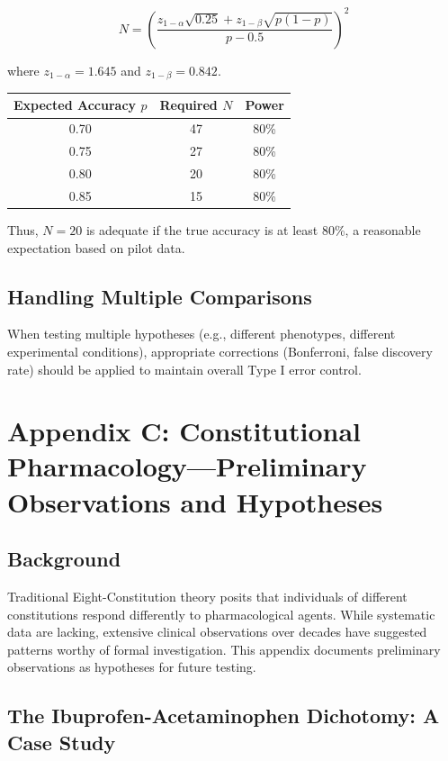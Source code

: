 \documentclass[12pt,a4paper]{article}
\begin{document}
\[
N = \left( \frac{z_{1-\alpha}\sqrt{0.25} + z_{1-\beta}\sqrt{p(1-p)}}{p-0.5} \right)^2
\]

where \(z_{1-\alpha} = 1.645\) and \(z_{1-\beta} = 0.842\).

\begin{center}
\begin{tabular}{ccc}
\toprule
Expected Accuracy \(p\) & Required \(N\) & Power \\
\midrule
0.70 & 47 & 80\% \\
0.75 & 27 & 80\% \\
0.80 & 20 & 80\% \\
0.85 & 15 & 80\% \\
\bottomrule
\end{tabular}
\end{center}

Thus, \(N=20\) is adequate if the true accuracy is at least 80\%, a reasonable expectation based on pilot data.

\subsection{Handling Multiple Comparisons}

When testing multiple hypotheses (e.g., different phenotypes, different experimental conditions), appropriate corrections (Bonferroni, false discovery rate) should be applied to maintain overall Type I error control.

\section{Appendix C: Constitutional Pharmacology—Preliminary Observations and Hypotheses}

\subsection{Background}

Traditional Eight-Constitution theory posits that individuals of different constitutions respond differently to pharmacological agents. While systematic data are lacking, extensive clinical observations over decades have suggested patterns worthy of formal investigation. This appendix documents preliminary observations as hypotheses for future testing.

\subsection{The Ibuprofen-Acetaminophen Dichotomy: A Case Study}
\end{document}
